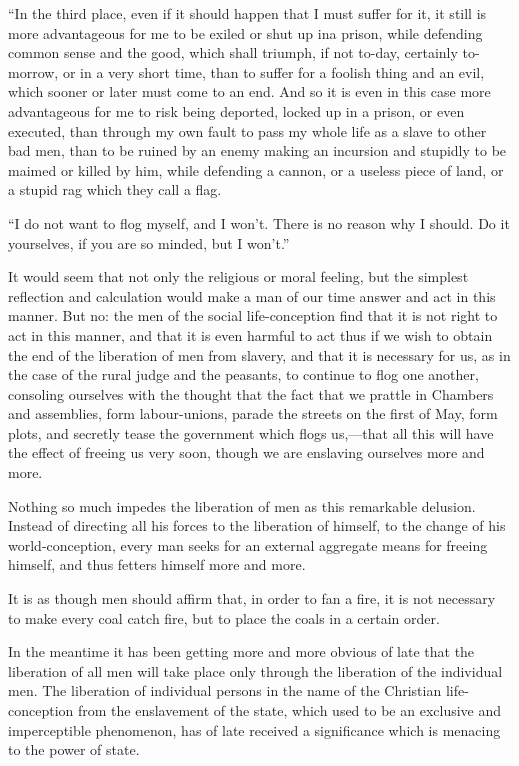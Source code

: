 \documentclass{book}
\begin{document}
“In the third place, even if it should happen that I must suffer for it, it still is more advantageous for me to be exiled or shut up ina prison, while defending common sense and the good, which shall triumph, if not to-day, certainly to-morrow, or in a very short time, than to suffer for a foolish thing and an evil, which sooner or later must come to an end. And so it is even in this case more advantageous for me to risk being deported, locked up in a prison, or even executed, than through my own fault to pass my whole life as a slave to other bad men, than to be ruined by an enemy making an incursion and stupidly to be maimed or killed by him, while defending a cannon, or a useless piece of land, or a stupid rag which they call a flag.

“I do not want to flog myself, and I won’t. There is no reason why I should. Do it yourselves, if you are so minded, but I won’t.”

It would seem that not only the religious or moral feeling, but the simplest reflection and calculation would make a man of our time answer and act in this manner. But no: the men of the social life-conception find that it is not right to act in this manner, and that it is even harmful to act thus if we wish to obtain the end of the liberation of men from slavery, and that it is necessary for us, as in the case of the rural judge and the peasants, to continue to flog one another, consoling ourselves with the thought that the fact that we prattle in Chambers and assemblies, form labour-unions, parade the streets on the first of May, form plots, and secretly tease the government which flogs us,—that all this will have the effect of freeing us very soon, though we are enslaving ourselves more and more.

Nothing so much impedes the liberation of men as this remarkable delusion. Instead of directing all his forces to the liberation of himself, to the change of his world-conception, every man seeks for an external aggregate means for freeing himself, and thus fetters himself more and more.

It is as though men should affirm that, in order to fan a fire, it is not necessary to make every coal catch fire, but to place the coals in a certain order.

In the meantime it has been getting more and more obvious of late that the liberation of all men will take place only through the liberation of the individual men. The liberation of individual persons in the name of the Christian life-conception from the enslavement of the state, which used to be an exclusive and imperceptible phenomenon, has of late received a significance which is menacing to the power of state.
\end{document}
